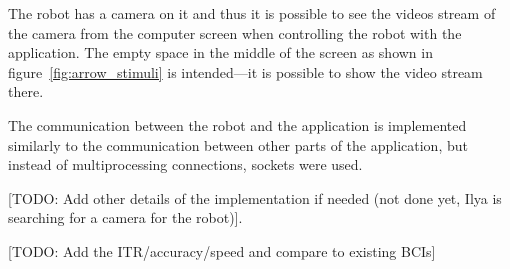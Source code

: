 The robot has a camera on it and thus it is possible to see the videos stream of the camera from the computer screen when controlling the robot with the application. The empty space in the middle of the screen as shown in figure~\ref{fig:arrow_stimuli} is intended---it is possible to show the video stream there.

The communication between the robot and the application is implemented similarly to the communication between other parts of the application, but instead of multiprocessing connections, sockets were used.

[TODO: Add other details of the implementation if needed (not done yet, Ilya is searching for a camera for the robot)].

[TODO: Add the ITR/accuracy/speed and compare to existing BCIs]
